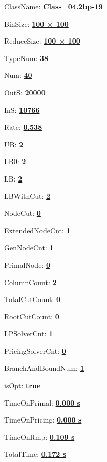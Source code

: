 \documentclass[11pt]{article}
\begin{document}
\pagestyle{empty}


ClassName: \underline{\textbf{Class_04.2bp-19}}
\par
BinSize: \underline{\textbf{100 × 100}}
\par
ReduceSize: \underline{\textbf{100 × 100}}
\par
TypeNum: \underline{\textbf{38}}
\par
Num: \underline{\textbf{40}}
\par
OutS: \underline{\textbf{20000}}
\par
InS: \underline{\textbf{10766}}
\par
Rate: \underline{\textbf{0.538}}
\par
UB: \underline{\textbf{2}}
\par
LB0: \underline{\textbf{2}}
\par
LB: \underline{\textbf{2}}
\par
LBWithCut: \underline{\textbf{2}}
\par
NodeCut: \underline{\textbf{0}}
\par
ExtendedNodeCnt: \underline{\textbf{1}}
\par
GenNodeCnt: \underline{\textbf{1}}
\par
PrimalNode: \underline{\textbf{0}}
\par
ColumnCount: \underline{\textbf{2}}
\par
TotalCutCount: \underline{\textbf{0}}
\par
RootCutCount: \underline{\textbf{0}}
\par
LPSolverCnt: \underline{\textbf{1}}
\par
PricingSolverCnt: \underline{\textbf{0}}
\par
BranchAndBoundNum: \underline{\textbf{1}}
\par
isOpt: \underline{\textbf{true}}
\par
TimeOnPrimal: \underline{\textbf{0.000 s}}
\par
TimeOnPricing: \underline{\textbf{0.000 s}}
\par
TimeOnRmp: \underline{\textbf{0.109 s}}
\par
TotalTime: \underline{\textbf{0.172 s}}
\par
\newpage
\end{document}
